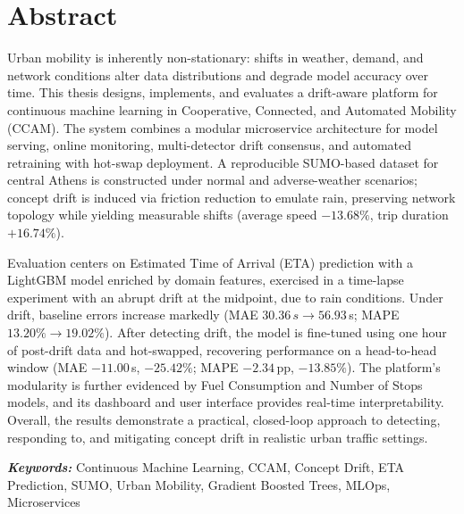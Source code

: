 \chapter*{Abstract}

Urban mobility is inherently non-stationary: shifts in weather, demand, and network conditions alter data distributions and degrade model accuracy over time.
This thesis designs, implements, and evaluates a drift-aware platform for continuous machine learning in Cooperative, Connected, and Automated Mobility (CCAM).
The system combines a modular microservice architecture for model serving, online monitoring, multi-detector drift consensus, and automated retraining with hot-swap deployment.
A reproducible SUMO-based dataset for central Athens is constructed under normal and adverse-weather scenarios; concept drift is induced via friction reduction to emulate rain, preserving network topology while yielding measurable shifts (average speed $-13.68\%$, trip duration $+16.74\%$).

Evaluation centers on Estimated Time of Arrival (ETA) prediction with a LightGBM model enriched by domain features, exercised in a time-lapse experiment with an abrupt drift at the midpoint, due to rain conditions.
Under drift, baseline errors increase markedly (MAE $30.36\,s \rightarrow 56.93$\,s; MAPE $13.20\% \rightarrow 19.02\%$).
After detecting drift, the model is fine-tuned using one hour of post-drift data and hot-swapped, recovering performance on a head-to-head window (MAE $-11.00$\,s, $-25.42\%$; MAPE $-2.34$\,pp, $-13.85\%$).
The platform's modularity is further evidenced by Fuel Consumption and Number of Stops models, and its dashboard and user interface provides real-time interpretability.
Overall, the results demonstrate a practical, closed-loop approach to detecting, responding to, and mitigating concept drift in realistic urban traffic settings.

\textbf{\textit{Keywords:}}
Continuous Machine Learning, CCAM, Concept Drift, ETA Prediction, SUMO, Urban Mobility, Gradient Boosted Trees, MLOps, Microservices

\cleardoublepage
